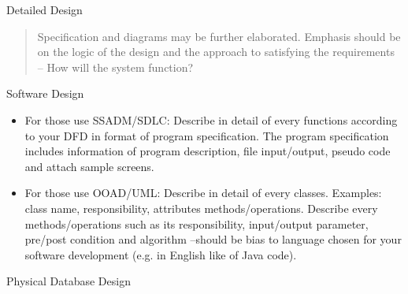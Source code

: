 \documentclass[12pt,a4paper]{article}
\begin{document}
Detailed Design

\begin{quote}
Specification and diagrams may be further elaborated. Emphasis should be
on the logic of the design and the approach to satisfying the
requirements -- How will the system function?
\end{quote}

Software Design

\begin{itemize}
\item
  For those use SSADM/SDLC: Describe in detail of every functions
  according to your DFD in format of program specification. The program
  specification includes information of program description, file
  input/output, pseudo code and attach sample screens.
\item
  For those use OOAD/UML: Describe in detail of every classes. Examples:
  class name, responsibility, attributes methods/operations. Describe
  every methods/operations such as its responsibility, input/output
  parameter, pre/post condition and algorithm --should be bias to
  language chosen for your software development (e.g. in English like of
  Java code).
\end{itemize}

Physical Database Design

\begin{quote}

\end{quote}
\end{document}
